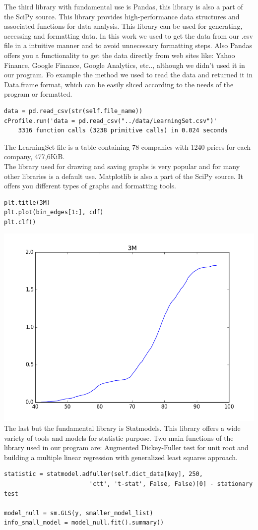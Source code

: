 \documentclass{article}
\begin{document}
The third library with fundamental use is Pandas, this library is also a part of the SciPy source. This library provides high-performance data structures and associated functions for data analysis. This library can be used for generating, accessing and formatting data. In this work we used to get the data from our .csv file in a intuitive manner and to avoid unnecessary formatting steps. Also Pandas offers you a functionality to get the data directly from web sites like: Yahoo Finance, Google Finance, Google Analytics, etc.., although we didn't used it in our program. Fo example the method we used to read the data and returned it in Data.frame format, which can be easily sliced according to the needs of the program or formatted.
\begin{verbatim}
data = pd.read_csv(str(self.file_name))
cProfile.run('data = pd.read_csv("../data/LearningSet.csv")'
    3316 function calls (3238 primitive calls) in 0.024 seconds
\end{verbatim}
The LearningSet file is a table containing 78 companies with 1240 prices for each company, 477,6KiB.\\
The library used for drawing and saving graphs is very popular and for many other libraries is a default use. Matplotlib is also a part of the SciPy source. It offers you different types of graphs and formatting tools.
\begin{verbatim}
plt.title(3M)
plt.plot(bin_edges[1:], cdf)
plt.clf()
\end{verbatim}
\includegraphics[scale=0.75]{PythonPlotExample.png} \\
The last but the fundamental library is Statmodels. This library offers a wide variety of tools and models for statistic purpose. Two main functions of the library used in our program are: Augmented Dickey-Fuller test for unit root and building a multiple linear regression with generalized least squares approach.
\begin{verbatim}
statistic = statmodel.adfuller(self.dict_data[key], 250, 
                        'ctt', 't-stat', False, False)[0] - stationary test
                        
model_null = sm.GLS(y, smaller_model_list)
info_small_model = model_null.fit().summary()
\end{verbatim}   
\end{document}
